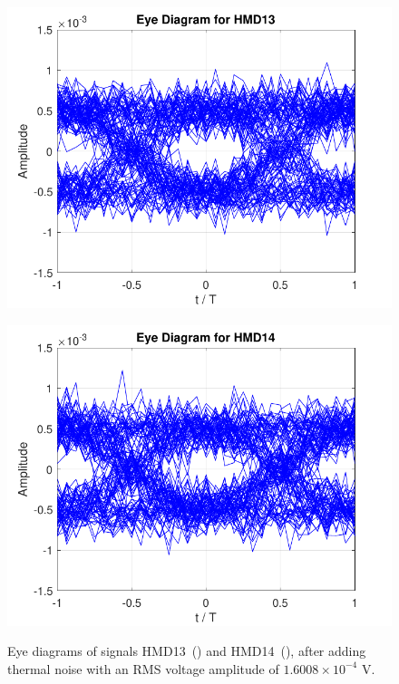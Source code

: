 	\begin{figure}[H]
	\centering
	\begin{minipage}{0.45\textwidth}
		\centering
		\includegraphics[width=1\textwidth]		
		{./sdf/m_qam_system/figures/simulations/02_thermal/HMD13ed.pdf}
		\subcaption{}\label{fig:sim_thermalHmd13ed}
	\end{minipage}
	\begin{minipage}{0.45\textwidth}
		\centering
		\includegraphics[width=1\textwidth]
		{sdf/m_qam_system/figures/simulations/02_thermal/HMD14ed.pdf}
		\subcaption{}\label{fig:sim_thermalHmd14ed}
	\end{minipage}
	\caption{Eye diagrams of signals HMD13~() and 
		HMD14~(), after adding thermal 
		noise with an RMS voltage amplitude of $1.6008 \times 10^{-4}$ 
		V.}\label{fig:sim_thermalHmd1314ed}
\end{figure}

